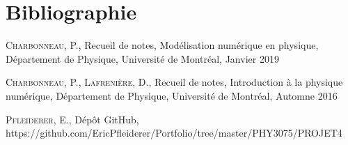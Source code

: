 \documentclass{article}
\begin{document}
\section{Bibliographie}\label{sec:bibliographie}
\begin{thebibliography}{l}
	\textsc{Charbonneau}, P., Recueil de notes, Modélisation numérique en physique, Département de Physique, Université de Montréal, Janvier 2019
	
	\textsc{Charbonneau}, P., \textsc{Lafrenière}, D., Recueil de notes, Introduction à la physique numérique, Département de Physique, Université de Montréal, Automne 2016
	
	\textsc{Pfleiderer}, E., Dépôt GitHub, https://github.com/EricPfleiderer/Portfolio/tree/master/PHY3075/PROJET4
\end{thebibliography}
\end{document}
